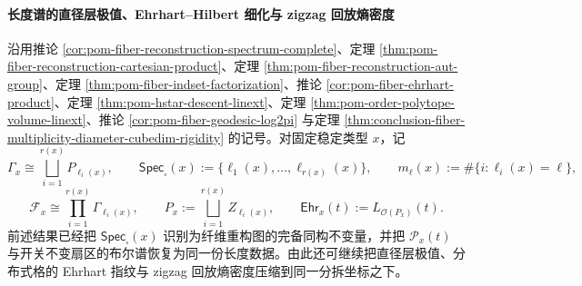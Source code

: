 \paragraph{长度谱的直径层极值、Ehrhart--Hilbert 细化与 zigzag 回放熵密度}
沿用推论 \ref{cor:pom-fiber-reconstruction-spectrum-complete}、定理 \ref{thm:pom-fiber-reconstruction-cartesian-product}、定理 \ref{thm:pom-fiber-reconstruction-aut-group}、定理 \ref{thm:pom-fiber-indset-factorization}、推论 \ref{cor:pom-fiber-ehrhart-product}、定理 \ref{thm:pom-hstar-descent-linext}、定理 \ref{thm:pom-order-polytope-volume-linext}、推论 \ref{cor:pom-fiber-geodesic-log2pi} 与定理 \ref{thm:conclusion-fiber-multiplicity-diameter-cubedim-rigidity} 的记号。对固定稳定类型 \(x\)，记
\[
\Gamma_x\cong\bigsqcup_{i=1}^{r(x)}P_{\ell_i(x)},
\qquad
\mathsf{Spec}_{\square}(x):=\{\ell_1(x),\dots,\ell_{r(x)}(x)\},
\qquad
m_\ell(x):=\#\{i:\ell_i(x)=\ell\},
\]
\[
\mathcal F_x\cong \prod_{i=1}^{r(x)}\Gamma_{\ell_i(x)},
\qquad
P_x:=\bigsqcup_{i=1}^{r(x)} Z_{\ell_i(x)},
\qquad
\mathsf{Ehr}_x(t):=L_{\mathcal O(P_x)}(t).
\]
前述结果已经把 \(\mathsf{Spec}_{\square}(x)\) 识别为纤维重构图的完备同构不变量，并把 \(\mathscr P_x(t)\) 与开关不变扇区的布尔谱恢复为同一份长度数据。由此还可继续把直径层极值、分布式格的 Ehrhart 指纹与 zigzag 回放熵密度压缩到同一分拆坐标之下。

